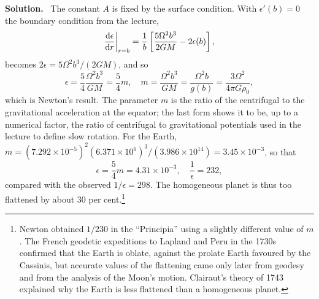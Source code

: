 \documentclass[a4paper,12pt]{paper}
\newenvironment{solution}{\par\noindent\textbf{Solution.}\ }{\par\medskip}
\begin{document}
\begin{solution}
The constant $A$ is fixed by the surface condition. With $\epsilon'(b)=0$ the boundary condition
from the lecture,
\begin{equation}
\frac{\mathrm{d}\epsilon}{\mathrm{d} r}\bigg|_{r=b}=\frac{1}{b}\left[\frac{5\Omega^{2}b^{3}}{2GM}-2\epsilon(b)\right],
\label{eq:25}
\end{equation}
becomes $2\epsilon=5\Omega^{2}b^{3}/(2GM)$, and so
\begin{equation}
\epsilon=\frac{5}{4}\frac{\Omega^{2}b^{3}}{GM}=\frac{5}{4}m,\quad m=\frac{\Omega^{2}b^{3}}{GM}=\frac{\Omega^{2}b}{g(b)}=\frac{3\Omega^{2}}{4\pi G\rho_{0}},
\label{eq:26}
\end{equation}
which is Newton's result. The parameter $m$ is the ratio of the centrifugal to the gravitational
acceleration at the equator; the last form shows it to be, up to a numerical factor, the ratio of
centrifugal to gravitational potentials used in the lecture to define slow rotation. For the
Earth, $m=(7.292\times10^{-5})^{2}(6.371\times10^{6})^{3}/(3.986\times10^{14})=3.45\times10^{-3}$,
so that
\begin{equation}
\epsilon=\frac{5}{4}m=4.31\times10^{-3},\quad\frac{1}{\epsilon}=232,
\label{eq:27}
\end{equation}
compared with the observed $1/\epsilon=298$. The homogeneous planet is thus too flattened by
about $30$ per cent.\footnote{Newton obtained $1/230$ in the ``Principia'' using a slightly different
value of $m$. The French geodetic expeditions to Lapland and Peru in the 1730s confirmed that the
Earth is oblate, against the prolate Earth favoured by the Cassinis, but accurate values of the
flattening came only later from geodesy and from the analysis of the Moon's motion. Clairaut's
theory of 1743 explained why the Earth is less flattened than a homogeneous planet.}


\end{solution}
\end{document}
